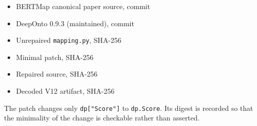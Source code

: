 \begin{itemize}
\item BERTMap canonical paper source, commit\\
\item DeepOnto 0.9.3 (maintained), commit\\
\item Unrepaired \texttt{mapping.py}, SHA-256\\
\item Minimal patch, SHA-256\\
\item Repaired source, SHA-256\\
\item Decoded V12 artifact, SHA-256\\
\end{itemize}

The patch changes only \texttt{dp["Score"]} to \texttt{dp.Score}. Its digest is
recorded so that the minimality of the change is checkable rather than asserted.

\endinput

